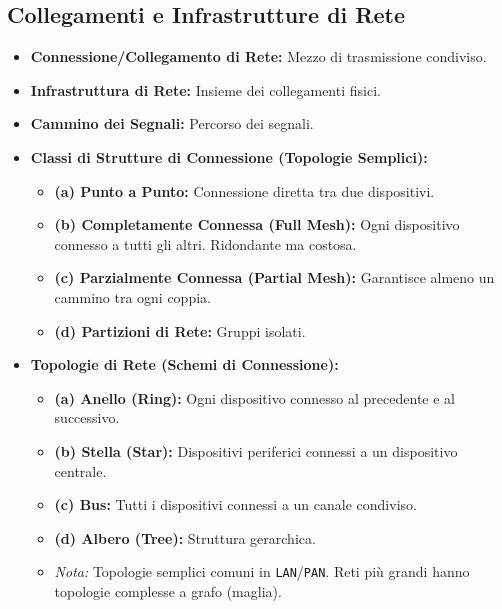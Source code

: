 \documentclass{article}
\begin{document}
\subsection{Collegamenti e Infrastrutture di Rete}
\begin{itemize}
    \item \textbf{Connessione/Collegamento di Rete:} Mezzo di trasmissione condiviso.
    \item \textbf{Infrastruttura di Rete:} Insieme dei collegamenti fisici.
    \item \textbf{Cammino dei Segnali:} Percorso dei segnali.
    \item \textbf{Classi di Strutture di Connessione (Topologie Semplici):}
    \begin{itemize}
        \item \textbf{(a) Punto a Punto:} Connessione diretta tra due dispositivi.
        \item \textbf{(b) Completamente Connessa (Full Mesh):} Ogni dispositivo connesso a tutti gli altri. Ridondante ma costosa.
        \item \textbf{(c) Parzialmente Connessa (Partial Mesh):} Garantisce almeno un cammino tra ogni coppia.
        \item \textbf{(d) Partizioni di Rete:} Gruppi isolati.
    \end{itemize}
    \item \textbf{Topologie di Rete (Schemi di Connessione):}
    \begin{itemize}
        \item \textbf{(a) Anello (Ring):} Ogni dispositivo connesso al precedente e al successivo.
        \item \textbf{(b) Stella (Star):} Dispositivi periferici connessi a un dispositivo centrale.
        \item \textbf{(c) Bus:} Tutti i dispositivi connessi a un canale condiviso.
        \item \textbf{(d) Albero (Tree):} Struttura gerarchica.
        \item \textit{Nota:} Topologie semplici comuni in \texttt{LAN}/\texttt{PAN}. Reti più grandi hanno topologie complesse a grafo (maglia).
    \end{itemize}
\end{itemize}
\end{document}
